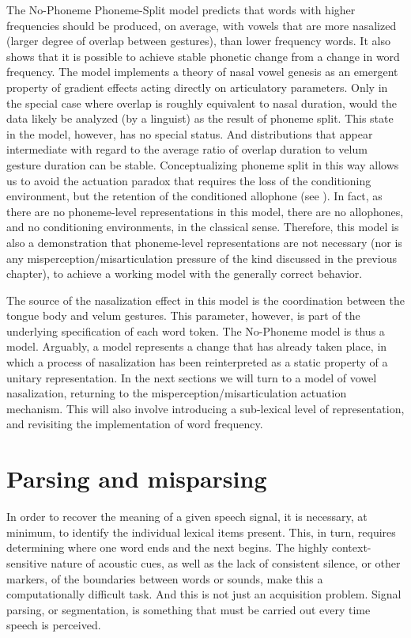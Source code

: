 The No-Phoneme Phoneme-Split model predicts that words with higher
frequencies should be produced, on average, with vowels that are more
nasalized (larger degree of overlap between gestures), than lower
frequency words. It also shows that it is possible to achieve stable
phonetic change from a change in word frequency. The model implements
a theory of nasal vowel genesis as an emergent property of gradient
effects acting directly on articulatory parameters. Only in the special
case where overlap is roughly equivalent to nasal duration, would
the data likely be analyzed (by a linguist) as the result of phoneme
split. This state in the model, however, has no special status. And
distributions that appear intermediate with regard to the average
ratio of overlap duration to velum gesture duration can be stable.
Conceptualizing phoneme split in this way allows us to avoid the actuation
paradox that requires the loss of the conditioning environment, but
the retention of the conditioned allophone (see ).
In fact, as there are no phoneme-level representations in this model,
there are no allophones, and no conditioning environments, in the
classical sense. Therefore, this model is also a demonstration that
phoneme-level representations are not necessary (nor is any misperception/misarticulation
pressure of the kind discussed in the previous chapter), to achieve
a working model with the generally correct behavior. 

The source of the nasalization effect in this model is the coordination
between the tongue body and velum gestures. This parameter, however,
is part of the underlying specification of each word token. The No-Phoneme
model is thus a  model. Arguably, a  model
represents a change that has already taken place, in which a process
of nasalization has been reinterpreted as a static property of a unitary
representation. In the next sections we will turn to a 
model of vowel nasalization, returning to the misperception/misarticulation
actuation mechanism. This will also involve introducing a sub-lexical
level of representation, and revisiting the implementation of word
frequency.

\section{Parsing and misparsing}

In order to recover the meaning of a given speech signal, it is necessary,
at minimum, to identify the individual lexical items present. This,
in turn, requires determining where one word ends and the next begins.
The highly context-sensitive nature of acoustic cues, as well as the
lack of consistent silence, or other markers, of the boundaries between
words or sounds, make this a computationally difficult task. And this
is not just an acquisition problem. Signal parsing, or segmentation,
is something that must be carried out every time speech is perceived. 

